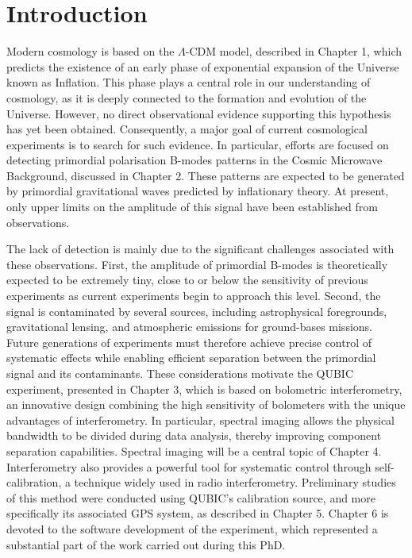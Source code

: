 \documentclass[../../thesis.tex]{subfiles}
\begin{document}
\chapter*{Introduction}

Modern cosmology is based on the $\Lambda$-CDM model, described in Chapter 1, which predicts the existence of an early phase of exponential expansion of the Universe known as Inflation. This phase plays a central role in our understanding of cosmology, as it is deeply connected to the formation and evolution of the Universe. However, no direct observational evidence supporting this hypothesis has yet been obtained. Consequently, a major goal of current cosmological experiments is to search for such evidence. In particular, efforts are focused on detecting primordial polarisation B-modes patterns in the Cosmic Microwave Background, discussed in Chapter 2. These patterns are expected to be generated by primordial gravitational waves predicted by inflationary theory. At present, only upper limits on the amplitude of this signal have been established from observations.

The lack of detection is mainly due to the significant challenges associated with these observations. First, the amplitude of primordial B-modes is theoretically expected to be extremely tiny, close to or below the sensitivity of previous experiments as current experiments begin to approach this level. Second, the signal is contaminated by several sources, including astrophysical foregrounds, gravitational lensing, and atmospheric emissions for ground-bases missions. Future generations of experiments must therefore achieve precise control of systematic effects while enabling efficient separation between the primordial signal and its contaminants. These considerations motivate the QUBIC experiment, presented in Chapter 3, which is based on bolometric interferometry, an innovative design combining the high sensitivity of bolometers with the unique advantages of interferometry. In particular, spectral imaging allows the physical bandwidth to be divided during data analysis, thereby improving component separation capabilities. Spectral imaging will be a central topic of Chapter 4. Interferometry also provides a powerful tool for systematic control through self-calibration, a technique widely used in radio interferometry. Preliminary studies of this method were conducted using QUBIC’s calibration source, and more specifically its associated GPS system, as described in Chapter 5. Chapter 6 is devoted to the software development of the experiment, which represented a substantial part of the work carried out during this PhD.
\end{document}
